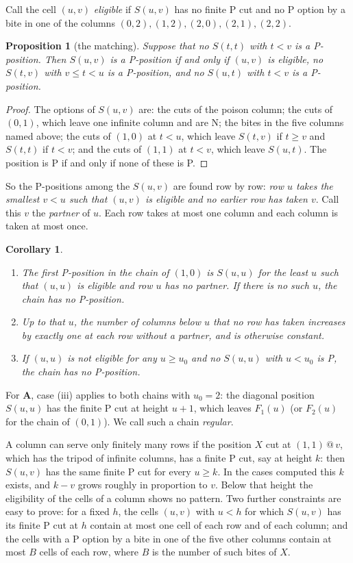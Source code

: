 \documentclass[11pt]{amsart}
\makeatletter
\newtheorem{corollary}[theorem]{Corollary}
\newtheorem{proposition}[theorem]{Proposition}
\theoremstyle{definition}
\theoremstyle{remark}
\newcommand{\cut}[2]{#1\,@\,#2}
\newcommand{\PA}{\mathbf{A}}
\makeatother
\begin{document}
Call the cell $(u,v)$ \emph{eligible} if $S(u,v)$ has no finite P cut and no P option by a bite
in one of the columns $(0,2),(1,2),(2,0),(2,1),(2,2)$.

\begin{proposition}[the matching]\label{prop:matching}
Suppose that no $S(t,t)$ with $t<v$ is a P-position. Then $S(u,v)$ is a P-position if and only
if $(u,v)$ is eligible, no $S(t,v)$ with $v\le t<u$ is a P-position, and no $S(u,t)$ with
$t<v$ is a P-position.
\end{proposition}
\begin{proof}
The options of $S(u,v)$ are: the cuts of the poison column; the cuts of $(0,1)$, which leave
one infinite column and are N; the bites in the five columns named above; the cuts of $(1,0)$
at $t<u$, which leave $S(t,v)$ if $t\ge v$ and $S(t,t)$ if $t<v$; and the cuts of $(1,1)$ at
$t<v$, which leave $S(u,t)$. The position is P if and only if none of these is P.
\end{proof}

So the P-positions among the $S(u,v)$ are found row by row: \emph{row $u$ takes the smallest
$v<u$ such that $(u,v)$ is eligible and no earlier row has taken $v$}. Call this $v$ the
\emph{partner} of $u$. Each row takes at most one column and each column is taken at most once.

\begin{corollary}\label{cor:chain}
\begin{enumerate}[label=\textup{(\roman*)}]
\item The first P-position in the chain of $(1,0)$ is $S(u,u)$ for the least $u$ such that
$(u,u)$ is eligible and row $u$ has no partner. If there is no such $u$, the chain has no
P-position.
\item Up to that $u$, the number of columns below $u$ that no row has taken increases by
exactly one at each row without a partner, and is otherwise constant.
\item If $(u,u)$ is not eligible for any $u\ge u_0$ and no $S(u,u)$ with $u<u_0$ is P, the
chain has no P-position.
\end{enumerate}
\end{corollary}

For $\PA$, case (iii) applies to both chains with $u_0=2$: the diagonal position $S(u,u)$ has the
finite P cut at height $u+1$, which leaves $F_1(u)$ (or $F_2(u)$ for the chain of $(0,1)$).
We call such a chain \emph{regular}.

A column can serve only finitely many rows if the position $X$ cut at $\cut{(1,1)}{v}$, which
has the tripod of infinite columns, has a finite P cut, say at height $k$: then $S(u,v)$ has
the same finite P cut for every $u\ge k$. In the cases computed this $k$ exists, and $k-v$
grows roughly in proportion to $v$. Below that height the eligibility of the cells of a
column shows no pattern. Two further constraints are easy to prove: for a fixed $h$, the
cells $(u,v)$ with $u<h$ for which $S(u,v)$ has its finite P cut at $h$ contain at most one
cell of each row and of each column; and the cells with a P option by a bite in one of the
five other columns contain at most $B$ cells of each row, where $B$ is the number of such
bites of $X$.
\end{document}
